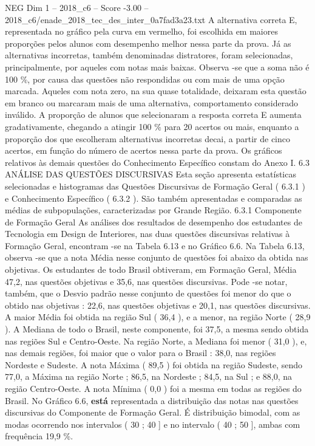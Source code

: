 \begin{textsample}{NEG Dim 1 – 2018\_c6 – Score -3.00 – 2018\_c6/enade\_2018\_tec\_des\_inter\_0a7fad3a23.txt}
A alternativa correta E, representada no gráfico pela curva em vermelho, foi escolhida em maiores proporções pelos alunos com desempenho melhor nessa parte da prova.
Já as alternativas incorretas, também denominadas distratores, foram selecionadas, principalmente, por aqueles com notas mais baixas.
Observa -se que a soma não é 100 \%, por causa das questões não respondidas ou com mais de uma opção marcada.
Aqueles com nota zero, na sua quase totalidade, deixaram esta questão em branco ou marcaram mais de uma alternativa, comportamento considerado inválido.
A proporção de alunos que selecionaram a resposta correta E aumenta gradativamente, chegando a atingir 100 \% para 20 acertos ou mais, enquanto a proporção dos que escolheram alternativas incorretas decai, a partir de cinco acertos, em função do número de acertos nessa parte da prova.
Os gráficos relativos às demais questões do Conhecimento Específico constam do Anexo I. 6.3 ANÁLISE DAS QUESTÕES DISCURSIVAS Esta seção apresenta estatísticas selecionadas e histogramas das Questões Discursivas de Formação Geral ( 6.3.1 ) e Conhecimento Específico ( 6.3.2 ).
São também apresentadas e comparadas as médias de subpopulações, caracterizadas por Grande Região. 6.3.1 Componente de Formação Geral As análises dos resultados de desempenho dos estudantes de Tecnologia em Design de Interiores, nas duas questões discursivas relativas à Formação Geral, encontram -se na Tabela 6.13 e no Gráfico 6.6.
Na Tabela 6.13, observa -se que a nota Média nesse conjunto de questões foi abaixo da obtida nas objetivas.
Os estudantes de todo Brasil obtiveram, em Formação Geral, Média 47,2, nas questões objetivas e 35,6, nas questões discursivas.
Pode -se notar, também, que o Desvio padrão nesse conjunto de questões foi menor do que o obtido nas objetivas : 22,6, nas questões objetivas e 20,1, nas questões discursivas.
A maior Média foi obtida na região Sul ( 36,4 ), e a menor, na região Norte ( 28,9 ).
A Mediana de todo o Brasil, neste componente, foi 37,5, a mesma sendo obtida nas regiões Sul e Centro-Oeste.
Na região Norte, a Mediana foi menor ( 31,0 ), e, nas demais regiões, foi maior que o valor para o Brasil : 38,0, nas regiões Nordeste e Sudeste.
A nota Máxima ( 89,5 ) foi obtida na região Sudeste, sendo 77,0, a Máxima na região Norte ; 86,5, na Nordeste ; 84,5, na Sul ; e 88,0, na região Centro-Oeste.
A nota Mínima ( 0,0 ) foi a mesma em todas as regiões do Brasil.
No Gráfico 6.6, \textbf{está} representada a distribuição das notas nas questões discursivas do Componente de Formação Geral.
É distribuição bimodal, com as modas ocorrendo nos intervalos ( 30 ; 40 ] e no intervalo ( 40 ; 50 ], ambas com frequência 19,9 \%.

\end{textsample}
